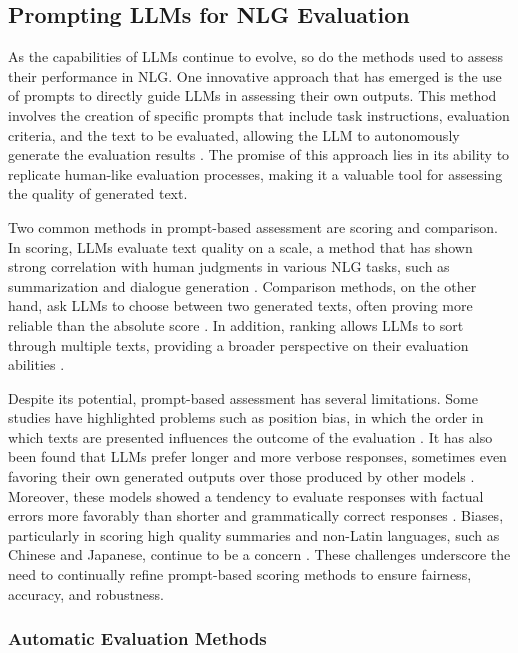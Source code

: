 \subsection{Prompting LLMs for NLG Evaluation}

As the capabilities of LLMs continue to evolve, so do the methods used to assess their performance in NLG. One innovative approach that has emerged is the use of prompts to directly guide LLMs in assessing their own outputs. This method involves the creation of specific prompts that include task instructions, evaluation criteria, and the text to be evaluated, allowing the LLM to autonomously generate the evaluation results \cite{gao2024llm}. The promise of this approach lies in its ability to replicate human-like evaluation processes, making it a valuable tool for assessing the quality of generated text.

Two common methods in prompt-based assessment are scoring and comparison. In scoring, LLMs evaluate text quality on a scale, a method that has shown strong correlation with human judgments in various NLG tasks, such as summarization and dialogue generation \cite{chiang2023can}. Comparison methods, on the other hand, ask LLMs to choose between two generated texts, often proving more reliable than the absolute score \cite{luo2023chatgpt}. In addition, ranking allows LLMs to sort through multiple texts, providing a broader perspective on their evaluation abilities \cite{ji2023exploring}.

Despite its potential, prompt-based assessment has several limitations. Some studies have highlighted problems such as position bias, in which the order in which texts are presented influences the outcome of the evaluation \cite{wang2023large}. It has also been found that LLMs prefer longer and more verbose responses, sometimes even favoring their own generated outputs over those produced by other models \cite{zheng2024judging, liu2023g}. Moreover, these models showed a tendency to evaluate responses with factual errors more favorably than shorter and grammatically correct responses \cite{wu2023style}. Biases, particularly in scoring high quality summaries and non-Latin languages, such as Chinese and Japanese, continue to be a concern \cite{hada2023large}. These challenges underscore the need to continually refine prompt-based scoring methods to ensure fairness, accuracy, and robustness.

\subsubsection{Automatic Evaluation Methods}

